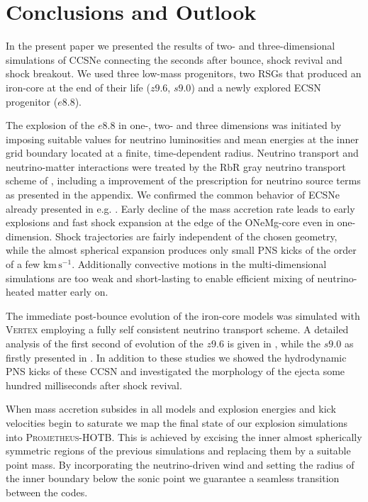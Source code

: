 \documentclass[fleqn,usenatbib]{mnras}
\newcommand{\kms}{\ensuremath{\mathrm{km\, s^{-1}}}}
\newcommand{\prom}{\textsc{Prometheus-HOTB}\xspace}
\newcommand{\vertex}{\textsc{Vertex}\xspace}
\begin{document}
\section{Conclusions and Outlook}
In the present paper we presented the results of two- and three-dimensional simulations of CCSNe connecting the seconds after bounce, shock revival and shock breakout. We used three low-mass progenitors, two RSGs that produced an iron-core at the end of their life ($z9.6$, $s9.0$) and a newly explored ECSN progenitor ($e8.8$). 

The explosion of the $e8.8$ in one-, two- and three dimensions was initiated by imposing suitable values for neutrino luminosities and mean energies at the inner grid boundary located at a finite, time-dependent radius. Neutrino transport and neutrino-matter interactions were treated by the RbR gray neutrino transport scheme of \citet{Scheck2006}, including a improvement of the prescription for neutrino source terms as presented in the appendix. We confirmed the common behavior of ECSNe already presented in e.g. \citet{Kitaura2006,Gessner2018}. Early decline of the mass accretion rate leads to early explosions and fast shock expansion at the edge of the ONeMg-core even in one-dimension. Shock trajectories are fairly independent of the chosen geometry, while the almost spherical expansion produces only small PNS kicks of the order of a few \kms. Additionally convective motions in the multi-dimensional simulations are too weak and short-lasting to enable efficient mixing of neutrino-heated matter early on.

The immediate post-bounce evolution of the iron-core models was simulated with \vertex employing a fully self consistent neutrino transport scheme. A detailed analysis of the first second of evolution of the $z9.6$ is given in \citet{Melson2015a}, while the $s9.0$ as firstly presented in \citet{Melson2019}. 
In addition to these studies we showed the hydrodynamic PNS kicks of these CCSN and investigated the morphology of the ejecta some hundred milliseconds after shock revival. 

When mass accretion subsides in all models and explosion energies and kick velocities begin to saturate we map the final state of our explosion simulations into \prom. This is achieved by excising the inner almost spherically symmetric regions of the previous simulations and replacing them by a suitable point mass. By incorporating the neutrino-driven wind and setting the radius of the inner boundary below the sonic point we guarantee a seamless transition between the codes.
\end{document}
